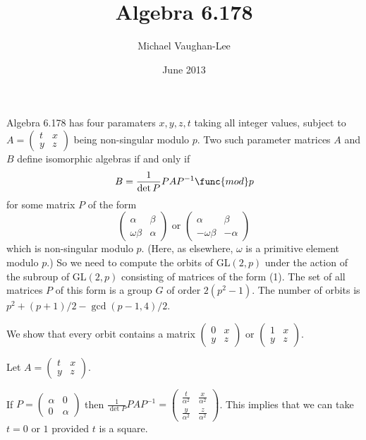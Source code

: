 \documentclass[12pt]{article}
\begin{document}
\title{Algebra 6.178}
\author{Michael Vaughan-Lee}
\date{June 2013}
\maketitle

Algebra 6.178 has four paramaters $x,y,z,t$ taking all integer values,
subject to $A=\left( 
\begin{array}{cc}
t & x \\ 
y & z%
\end{array}%
\right) $ being non-singular modulo $p$. Two such parameter matrices $A$ and 
$B$ define isomorphic algebras if and only if%
\[
B=\frac{1}{\det P}PAP^{-1}\func{mod}p
\]%
for some matrix $P$ of the form%
\begin{equation}
\left( 
\begin{array}{ll}
\alpha  & \beta  \\ 
\omega \beta  & \alpha 
\end{array}%
\right) \text{ or }\left( 
\begin{array}{ll}
\alpha  & \beta  \\ 
-\omega \beta  & -\alpha 
\end{array}%
\right) 
\end{equation}%
which is non-singular modulo $p$. (Here, as elsewhere, $\omega $ is a
primitive element modulo $p$.) So we need to compute the orbits of GL$(2,p)$
under the action of the subroup of GL$(2,p)$ consisting of matrices of the
form (1). The set of all matrices $P$ of this form is a group $G$ of order $%
2(p^{2}-1)$. The number of orbits is $p^{2}+(p+1)/2-\gcd (p-1,4)/2$.

We show that every orbit contains a matrix $\left( 
\begin{array}{cc}
0 & x \\ 
y & z%
\end{array}%
\right) $ or $\left( 
\begin{array}{cc}
1 & x \\ 
y & z%
\end{array}%
\right) $.

Let $A=\left( 
\begin{array}{cc}
t & x \\ 
y & z%
\end{array}%
\right) $.

If $P=\left( 
\begin{array}{ll}
\alpha  & 0 \\ 
0 & \alpha 
\end{array}%
\right) $ then $\frac{1}{\det P}PAP^{-1}=\allowbreak \left( 
\begin{array}{cc}
\frac{t}{\alpha ^{2}} & \frac{x}{\alpha ^{2}} \\ 
\frac{y}{\alpha ^{2}} & \frac{z}{\alpha ^{2}}%
\end{array}%
\right) $. This implies that we can take $t=0$ or $1$ provided $t$ is a
square.
\end{document}
